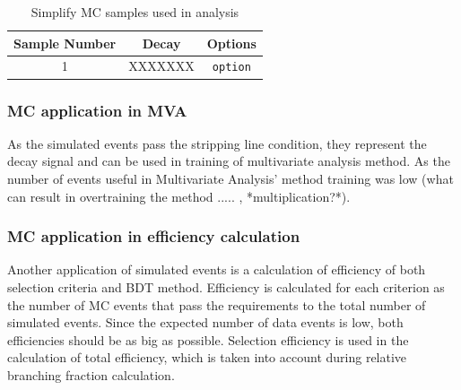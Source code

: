 \begin{table}[ht]
    \centering
    \begin{tabular}{ccc}
        \hline
        Sample Number &  Decay & Options\\
        \hline
        1 &  XXXXXXX  & \texttt{option}\\
    \end{tabular}
    \caption{Simplify MC samples used in analysis}
    \label{tab:MC_Simple}
\end{table}

\subsubsection{MC application in MVA}

As the simulated events pass the stripping line condition, they represent the decay signal and can be used in training of multivariate analysis method. As the number of events useful in Multivariate Analysis' method training was low (what can result in overtraining the method ..... , *multiplication?*).

\subsubsection{MC application in efficiency calculation}

Another application of simulated events is a calculation of efficiency of both selection criteria and BDT method. Efficiency is calculated for each criterion as the number of MC events that pass the requirements to the total number of simulated events.  Since the expected number of data events is low, both efficiencies should be as big as possible. Selection efficiency is used in the calculation of total efficiency, which is taken into account during relative branching fraction calculation. 